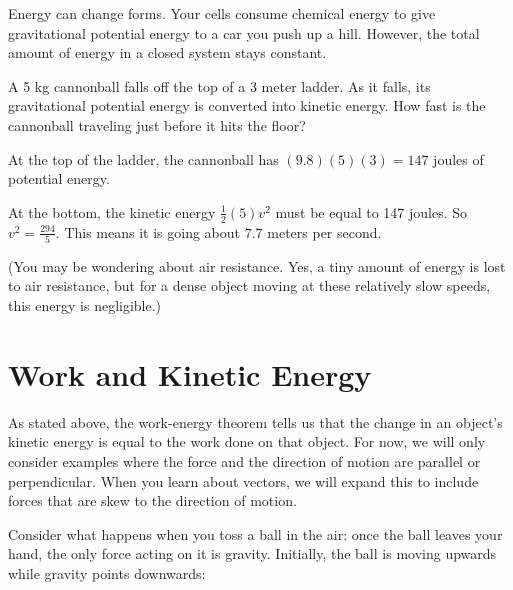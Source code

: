 Energy can change forms. Your cells consume chemical energy to give gravitational 
potential energy to a car you push up a hill. However, the total amount of energy 
in a closed system stays constant. 

\begin{Exercise}[title={The Energy of Falling}, label=energy_falling]

A 5 kg cannonball falls off the top of a 3 meter ladder. As it falls, its 
gravitational potential energy is converted into kinetic energy. How fast is 
the cannonball traveling just before it hits the floor?

\end{Exercise}
\begin{Answer}[ref=energy_falling]

  At the top of the ladder, the cannonball has $(9.8)(5)(3) = 147$ joules of potential energy.

  At the bottom, the kinetic energy $\frac{1}{2}(5)v^2$ must be equal
  to 147 joules. So $v^2 = \frac{294}{5}$.  This means it is going about
  $7.7$ meters per second.

  (You may be wondering about air resistance. Yes, a tiny amount of energy is 
  lost to air resistance, but for a dense object moving at these relatively slow 
  speeds, this energy is negligible.)

\end{Answer}

\section{Work and Kinetic Energy}
As stated above, the work-energy theorem tells us that the change in an object's 
kinetic energy is equal to the work done on that object. For now, we will only 
consider examples where the force and the direction of motion are parallel or 
perpendicular. When you learn about vectors, we will expand this to include 
forces that are skew to the direction of motion. 

Consider what happens when you toss a ball in the air: once the ball leaves your 
hand, the only force acting on it is gravity. Initially, the ball is moving 
upwards while gravity points downwards:

